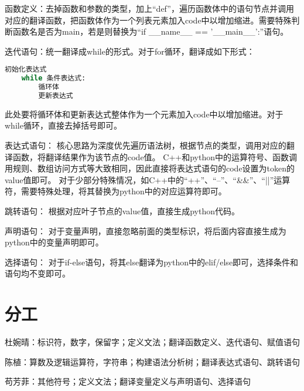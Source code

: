 \documentclass{article}
\begin{document}
函数定义：去掉函数和参数的类型，加上“def”，遍历函数体中的语句节点并调用对应的翻译函数，把函数体作为一个列表元素加入code中以增加缩进。需要特殊判断函数名是否为main，若是则替换为“if \_\_name\_\_ == '\_\_main\_\_':”语句。

迭代语句：统一翻译成while的形式。对于for循环，翻译成如下形式：
\begin{lstlisting}[language=Python]
    初始化表达式
    while 条件表达式:
        循环体
        更新表达式
\end{lstlisting}
此处要将循环体和更新表达式整体作为一个元素加入code中以增加缩进。对于while循环，直接去掉括号即可。

表达式语句：
核心思路为深度优先遍历语法树，根据节点的类型，调用对应的翻译函数，将翻译结果作为该节点的code值。
C++和python中的运算符号、函数调用规则、数组访问方式等大致相同，因此直接将表达式语句的code设置为token的value值即可。
对于少部分特殊情况，如C++中的“++”、“--”、“\&\&”、“||”运算符，需要特殊处理，将其替换为python中的对应运算符即可。


跳转语句：
根据对应叶子节点的value值，直接生成python代码。

声明语句：
对于变量声明，直接忽略前面的类型标识，将后面内容直接生成为python中的变量声明即可。

选择语句：
对于if-else语句，将其else翻译为python中的elif/else即可，选择条件和语句均不变即可。

\section{分工}
杜婉晴：标识符，数字，保留字；定义文法；翻译函数定义、迭代语句、赋值语句

陈植：算数及逻辑运算符，字符串；构建语法分析树；翻译表达式语句、跳转语句

苟芳菲：其他符号；定义文法；翻译变量定义与声明语句、选择语句
\end{document}
